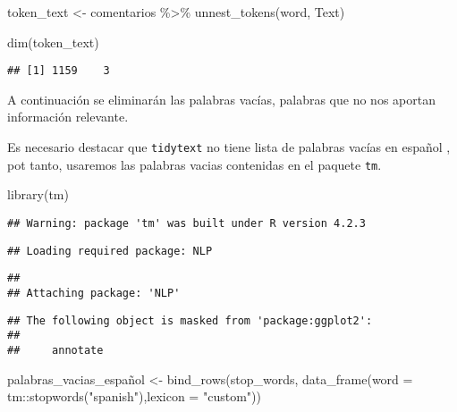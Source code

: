 \documentclass[
]{article}
\newenvironment{Shaded}{\begin{snugshade}}{\end{snugshade}}
\newcommand{\AttributeTok}[1]{\textcolor[rgb]{0.77,0.63,0.00}{#1}}
\newcommand{\FunctionTok}[1]{\textcolor[rgb]{0.00,0.00,0.00}{#1}}
\newcommand{\NormalTok}[1]{#1}
\newcommand{\OtherTok}[1]{\textcolor[rgb]{0.56,0.35,0.01}{#1}}
\newcommand{\SpecialCharTok}[1]{\textcolor[rgb]{0.00,0.00,0.00}{#1}}
\newcommand{\StringTok}[1]{\textcolor[rgb]{0.31,0.60,0.02}{#1}}
\begin{document}
\begin{Shaded}
\begin{Highlighting}[]
\NormalTok{token\_text }\OtherTok{\textless{}{-}}\NormalTok{ comentarios }\SpecialCharTok{\%\textgreater{}\%} 
  \FunctionTok{unnest\_tokens}\NormalTok{(word, Text)}

\FunctionTok{dim}\NormalTok{(token\_text)}
\end{Highlighting}
\end{Shaded}

\begin{verbatim}
## [1] 1159    3
\end{verbatim}

A continuación se eliminarán las palabras vacías, palabras que no nos
aportan información relevante.

Es necesario destacar que \texttt{tidytext} no tiene lista de palabras
vacías en español , pot tanto, usaremos las palabras vacias contenidas
en el paquete \texttt{tm}.

\begin{Shaded}
\begin{Highlighting}[]
\FunctionTok{library}\NormalTok{(tm)}
\end{Highlighting}
\end{Shaded}

\begin{verbatim}
## Warning: package 'tm' was built under R version 4.2.3
\end{verbatim}

\begin{verbatim}
## Loading required package: NLP
\end{verbatim}

\begin{verbatim}
## 
## Attaching package: 'NLP'
\end{verbatim}

\begin{verbatim}
## The following object is masked from 'package:ggplot2':
## 
##     annotate
\end{verbatim}

\begin{Shaded}
\begin{Highlighting}[]
\NormalTok{palabras\_vacias\_español }\OtherTok{\textless{}{-}} \FunctionTok{bind\_rows}\NormalTok{(stop\_words,}
                                     \FunctionTok{data\_frame}\NormalTok{(}\AttributeTok{word =}\NormalTok{ tm}\SpecialCharTok{::}\FunctionTok{stopwords}\NormalTok{(}\StringTok{"spanish"}\NormalTok{),}\AttributeTok{lexicon =} \StringTok{"custom"}\NormalTok{))}
\end{Highlighting}
\end{Shaded}
\end{document}
